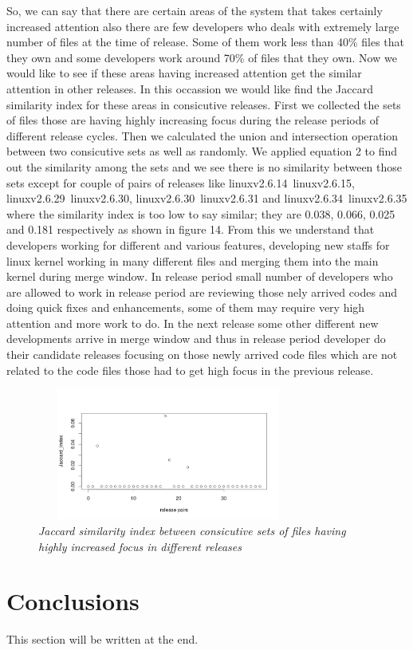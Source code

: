 \documentclass{acm_proc_article-sp}
\begin{document}
So, we can say that there are certain areas of the system that takes certainly increased attention also there are few developers who deals with extremely large number of files at the time of release. Some of them work less than 40\% files that they own and some developers work around 70\% of files that they own. Now we would like to see if these areas having increased attention get the similar attention in other releases. In this occassion we would like find the Jaccard similarity index for these areas in consicutive releases. First we collected the sets of files those are having highly increasing focus during the release periods of different release cycles. Then we calculated the union and intersection operation between two consicutive sets as well as randomly. We applied equation 2 to find  out the similarity among the sets and we see there is no similarity between those sets except for couple of pairs of releases like linuxv2.6.14~linuxv2.6.15,  linuxv2.6.29~linuxv2.6.30, linuxv2.6.30~linuxv2.6.31 and linuxv2.6.34~linuxv2.6.35 where the similarity index is too low to say similar; they are 0.038, 0.066, 0.025 and 0.181 respectively as shown in figure 14. From this we understand that developers working for different and various features, developing new staffs for linux kernel working in many different files and merging them into the main kernel during merge window. In release period small number of developers who are allowed to work in release period are reviewing those nely arrived codes and doing quick fixes and enhancements, some of them may require very high attention and more work to do. In the next release some other different new developments arrive in merge window and thus in release period developer do their candidate releases focusing on those newly arrived code files which are not related to the code files those had to get high focus in the previous release.

\begin{figure}
\begin{center}
\includegraphics[height=1.7in,width=3.4in]{jdRPHighFocusFiles.png}
\caption{\small \sl Jaccard similarity index between consicutive sets of files having highly increased focus in different releases}
\end{center}
\end{figure}

\section{Conclusions}
This section will be written at the end.


 

\balancecolumns
\end{document}
